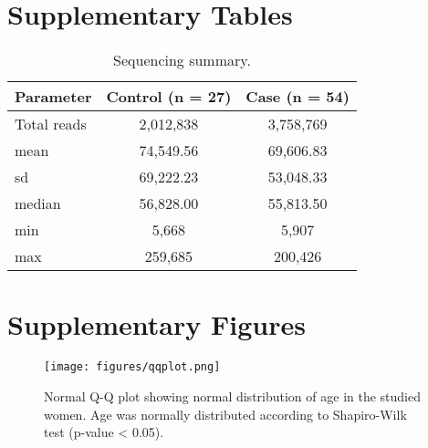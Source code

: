 \documentclass[biotech,article,submit,pdftex,moreauthors]{Definitions/mdpi}
\begin{document}

\appendixstart
\appendix
\section[\appendixname~\thesection]{Supplementary Tables}

\begin{table}[H] 
	\caption{Sequencing summary. \label{stab:seq_sum}}
	\centering
	\begin{tabular}{l|cc}
		\toprule
		\textbf{Parameter} & \textbf{Control (n = 27)} & \textbf{Case (n = 54)} \\
		\midrule
		Total reads       & 2,012,838  & 3,758,769  \\
		mean              & 74,549.56  & 69,606.83  \\
		sd                & 69,222.23  & 53,048.33  \\
		median            & 56,828.00  & 55,813.50  \\
		min               & 5,668      & 5,907      \\
		max               & 259,685    & 200,426    \\
		\bottomrule
	\end{tabular}
\end{table}
	

\section[\appendixname~\thesection]{Supplementary Figures}

\begin{figure}[H]
	\centering
	\texttt{[image: figures/qqplot.png]}
	\caption{Normal Q-Q plot showing normal distribution of age in the studied women. Age was normally distributed according to Shapiro-Wilk test (p-value < 0.05).}
	\label{sfig:qqplot}
\end{figure}
\end{document}
